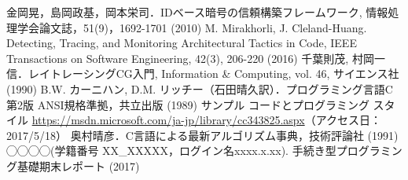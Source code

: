\documentclass[a4j,11pt]{jarticle}
\begin{document}
\begin{thebibliography}{20}
 金岡晃，島岡政基，岡本栄司．IDベース暗号の信頼構築フレームワーク, 情報処理学会論文誌，51(9)，1692-1701 (2010)
 M. Mirakhorli, J. Cleland-Huang. Detecting, Tracing, and Monitoring Architectural Tactics in Code, IEEE Transactions on Software Engineering, 42(3), 206-220 (2016)
 千葉則茂, 村岡一信．レイトレーシングCG入門, Information \& Computing, vol. 46, サイエンス社 (1990)
 B.W. カーニハン, D.M. リッチー（石田晴久訳）．プログラミング言語C 第2版 ANSI規格準拠，共立出版 (1989)
 サンプル コードとプログラミング スタイル \url{https://msdn.microsoft.com/ja-jp/library/cc343825.aspx}（アクセス日：2017/5/18）
奥村晴彦．C言語による最新アルゴリズム事典，技術評論社 (1991)
 ◯◯◯◯(学籍番号 XX\_{}XXXXX，ログイン名xxxx.x.xx). 手続き型プログラミング基礎期末レポート (2017)
\end{thebibliography}
\end{document}
